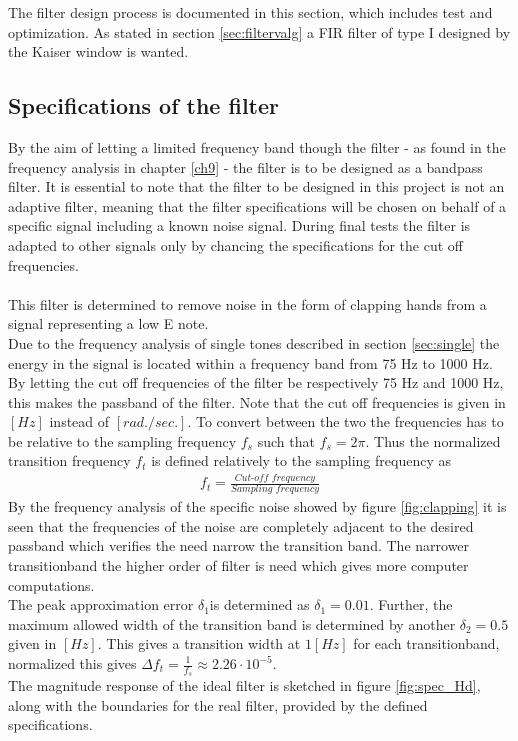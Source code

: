 The filter design process is documented in this section, which includes test and optimization. As stated in section \ref{sec:filtervalg} a FIR filter of type I designed by the Kaiser window is wanted.

\subsection{Specifications of the filter} \label{sec:FIRspec} 
By the aim of letting a limited frequency band though the filter - as found in the frequency analysis in chapter \ref{ch9} - the filter is to be designed as a bandpass filter. It is essential to note that the filter to be designed in this project is not an adaptive filter, meaning that the filter specifications will be chosen on behalf of a specific signal including a known noise signal. During final tests the filter is adapted to other signals only by chancing the specifications for the cut off frequencies. \\ \\
This filter is determined to remove noise in the form of clapping hands from a signal representing a low E note. \\
Due to the frequency analysis of single tones described in section \ref{sec:single} the energy in the signal is located within a frequency band from 75 Hz to 1000 Hz.  
By letting the cut off frequencies of the filter be respectively 75 Hz and 1000 Hz, this makes the passband of the filter. Note that the cut off frequencies is given in $[Hz]$ instead of $[rad./sec.]$. To convert between the two the frequencies has to be relative to the sampling frequency $f_s$ such that $f_s = 2\pi$. Thus the normalized transition frequency $f_t$ is defined relatively to the sampling frequency as
\begin{align}
f_t = \frac{\textit{Cut-off frequency}}{\textit{Sampling frequency}}
\end{align}
By the frequency analysis of the specific noise showed by figure \ref{fig:clapping} it is seen that the frequencies of the noise are completely adjacent to the desired passband which verifies the need narrow the  transition band. The narrower transitionband the higher order of filter is need which gives more computer computations. \\  

The peak approximation error $\delta_1$is determined as $\delta_1=0.01$. Further, the maximum allowed width of the transition band is determined by another $\delta_2 = 0.5$ given in $[Hz]$. This gives a transition width at $1 [Hz]$ for each transitionband, normalized this gives $\Delta f_t = \frac{1 }{f_s} \approx 2.26 \cdot 10^{-5}$.\\
The magnitude response of the ideal filter is sketched in figure \ref{fig:spec_Hd}, along with the boundaries for the real filter, provided by the defined specifications.      

